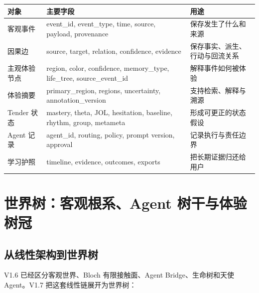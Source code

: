 \documentclass[UTF8,a4paper,11pt]{ctexart}
\begin{document}
\begin{center}
\begin{longtable}{@{}p{3.6cm}p{5.0cm}p{5.9cm}@{}}
\toprule
\textbf{对象} & \textbf{主要字段} & \textbf{用途} \\
\midrule
客观事件 & event\_id, event\_type, time, source, payload, provenance & 保存发生了什么和来源 \\
因果边 & source, target, relation, confidence, evidence & 保存事实、派生、行动与回流关系 \\
主观体验节点 & region, color, confidence, memory\_type, life\_tree, source\_event\_id & 解释事件如何被体验 \\
体验摘要 & primary\_region, regions, uncertainty, annotation\_version & 支持检索、解释与溯源 \\
Tender 状态 & mastery, theta, JOL, hesitation, baseline, rhythm, group, metameta & 形成可更正的状态假设 \\
Agent 记录 & agent\_id, routing, policy, prompt version, approval & 记录执行与责任边界 \\
学习护照 & timeline, evidence, outcomes, exports & 把长期证据归还给用户 \\
\bottomrule
\end{longtable}
\end{center}

\newpage
\section{世界树：客观根系、Agent 树干与体验树冠}

\subsection{从线性架构到世界树}

V1.6 已经区分客观世界、Bloch 有限接触面、Agent Bridge、生命树和天使 Agent。V1.7 把这套线性链展开为世界树：
\end{document}
